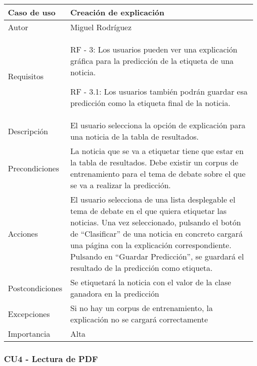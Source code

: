 \begin{center}
\begin{tabular}{ | m{3cm} | m{10cm}| } 
\hline
Caso de uso & Creación de explicación \\ 
\hline
Autor & Miguel Rodríguez \\ 
\hline
Requisitos & RF - 3: Los usuarios pueden ver una explicación gráfica para la predicción de la etiqueta de una noticia.

RF - 3.1: Los usuarios también podrán guardar esa predicción como la etiqueta final de la noticia.\\ 
\hline
Descripción & El usuario selecciona la opción de explicación para una noticia de la tabla de resultados. \\
\hline
Precondiciones & La noticia que se va a etiquetar tiene que estar en la tabla de resultados. Debe existir un corpus de entrenamiento para el tema de debate sobre el que se va a realizar la predicción. \\
\hline
Acciones & El usuario selecciona de una lista desplegable el tema de debate en el que quiera etiquetar las noticias. Una vez seleccionado, pulsando el botón de ``Clasificar'' de una noticia en concreto cargará una página con la explicación correspondiente. Pulsando en ``Guardar Predicción'', se guardará el resultado de la predicción como etiqueta. \\
\hline
Postcondiciones & Se etiquetará la noticia con el valor de la clase ganadora en la predicción \\
\hline
Excepciones & Si no hay un corpus de entrenamiento, la explicación no se cargará correctamente \\
\hline 
Importancia & Alta \\
\hline 
\end{tabular}
\end{center}

\subsubsection{CU4 - Lectura de PDF}

